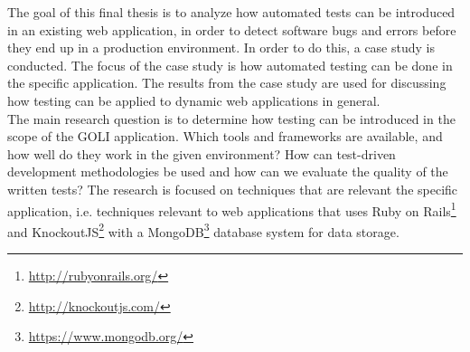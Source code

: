 
The goal of this final thesis is to analyze how automated tests can be
introduced in an existing web application, in order to detect software
bugs and errors before they end up in a production environment. In order
to do this, a case study is conducted. The focus of the case study is
how automated testing can be done in the specific application. The
results from the case study are used for discussing how testing can be
applied to dynamic web applications in general.\\

The main research question is to determine how testing can be introduced
in the scope of the GOLI application. Which tools and frameworks are
available, and how well do they work in the given environment? How can
test-driven development methodologies be used and how can we evaluate
the quality of the written tests? The research is focused on techniques
that are relevant the specific application, i.e. techniques relevant
to web applications that uses Ruby on
Rails\footnote{\url{http://rubyonrails.org/}} and
KnockoutJS\footnote{\url{http://knockoutjs.com/}} with a
MongoDB\footnote{\url{https://www.mongodb.org/}} database system for
data storage.\\

